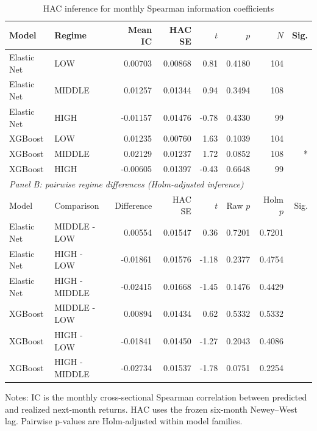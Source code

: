 \begin{table}[htbp]
\centering
\caption{HAC inference for monthly Spearman information coefficients}
\label{tab:rank-ic-three-state-inference}
\small
\begin{tabular}{llrrrrrr}
\hline
Model & Regime & Mean IC & HAC SE & $t$ & $p$ & $N$ & Sig. \\
\hline
Elastic Net & LOW & 0.00703 & 0.00868 & 0.81 & 0.4180 & 104 &  \\
Elastic Net & MIDDLE & 0.01257 & 0.01344 & 0.94 & 0.3494 & 108 &  \\
Elastic Net & HIGH & -0.01157 & 0.01476 & -0.78 & 0.4330 & 99 &  \\
XGBoost & LOW & 0.01235 & 0.00760 & 1.63 & 0.1039 & 104 &  \\
XGBoost & MIDDLE & 0.02129 & 0.01237 & 1.72 & 0.0852 & 108 & * \\
XGBoost & HIGH & -0.00605 & 0.01397 & -0.43 & 0.6648 & 99 &  \\
\hline
\multicolumn{8}{l}{\textit{Panel B: pairwise regime differences (Holm-adjusted inference)}} \\
Model & Comparison & Difference & HAC SE & $t$ & Raw $p$ & Holm $p$ & Sig. \\
\hline
Elastic Net & MIDDLE - LOW & 0.00554 & 0.01547 & 0.36 & 0.7201 & 0.7201 &  \\
Elastic Net & HIGH - LOW & -0.01861 & 0.01576 & -1.18 & 0.2377 & 0.4754 &  \\
Elastic Net & HIGH - MIDDLE & -0.02415 & 0.01668 & -1.45 & 0.1476 & 0.4429 &  \\
XGBoost & MIDDLE - LOW & 0.00894 & 0.01434 & 0.62 & 0.5332 & 0.5332 &  \\
XGBoost & HIGH - LOW & -0.01841 & 0.01450 & -1.27 & 0.2043 & 0.4086 &  \\
XGBoost & HIGH - MIDDLE & -0.02734 & 0.01537 & -1.78 & 0.0751 & 0.2254 &  \\
\hline
\end{tabular}
\begin{flushleft}\footnotesize Notes: IC is the monthly cross-sectional Spearman correlation between predicted and realized next-month returns. HAC uses the frozen six-month Newey--West lag. Pairwise p-values are Holm-adjusted within model families.\end{flushleft}
\end{table}
